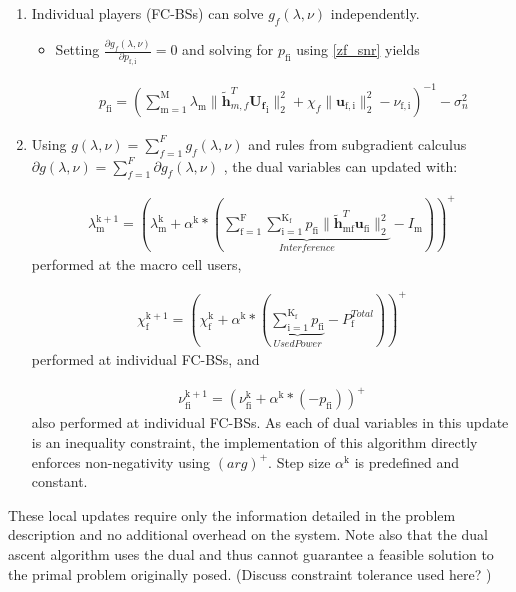 \documentclass[12pt,a4paper]{report}
\begin{document}
\begin{enumerate}
\item 
Individual players (FC-BSs) can solve $ g_f(\lambda,\nu) $ independently.
\begin{itemize}
\item Setting $\frac{\partial g_f(\lambda,\nu)}{\partial p_{\mathrm{f,i}}} = 0$ 
and solving for $p_{\mathrm{fi}}$ using \eqref{zf_snr} yields

\begin{gather}
p_{\mathrm{fi}} = (\sum_{\mathrm{m=1}}^{\mathrm{M}}\lambda_{\mathrm{m}}\|\mathbf{\tilde{h}}_{m,f}^T \mathbf{U_f}_{\mathrm{i}}\|^2_2
+\chi_{f} \|\mathbf{u}_{\mathrm{f,i}}\|^2_2
-\nu_{\mathrm{f,i}}
 )^{-1}
  - \sigma^2_n
\end{gather}

\end{itemize}
\item 
Using $g(\lambda,\nu) = \sum_{f=1}^{F}g_f(\lambda,\nu)$ and rules from subgradient calculus 
$\partial g(\lambda,\nu) = \sum_{f=1}^{F} \partial g_f(\lambda,\nu)$ 
, the dual variables can updated with:

\begin{gather}
\lambda_{\mathrm{m}}^{\mathrm{k+1}} = (
\lambda_{\mathrm{m}}^{\mathrm{k}}
+
\alpha^{\mathrm{k}}*
(
\underbrace{
\sum _{\mathrm{f=1}}^{\mathrm{F}}
\sum _{\mathrm{i=1}}^{\mathrm{K_{\mathrm{f}}}}
p_{\mathrm{fi}}
\|\mathbf{\tilde{h}}_{\mathrm{mf}}^T \mathbf{u_{\mathrm{fi}}}\|^2_2}_{Interference}
- I_{\mathrm{m}}
))^+
\end{gather}
performed at the macro cell users,

\begin{gather}
\chi_{\mathrm{f}}^{\mathrm{k+1}} = (
\chi_{\mathrm{f}}^{\mathrm{k}}
+
\alpha^{\mathrm{k}}*
(\underbrace{\sum_{\mathrm{i=1}}^{\mathrm{K_{\mathrm{f}}}} p_{\mathrm{fi}}}_{Used Power} - P_{\mathrm{f}}^{Total}) )^+
\end{gather}
performed at individual FC-BSs, and 

\begin{gather}
\nu_{\mathrm{fi}}^{\mathrm{k+1}} = (
\nu_{\mathrm{fi}}^{\mathrm{k}}
+
\alpha^{\mathrm{k}}*
(-p_{\mathrm{fi}}))^+
\end{gather}
also performed at individual FC-BSs.
As each of dual variables in this update is an inequality constraint, the implementation of this algorithm directly enforces non-negativity using 
$(arg)^+$.
Step size $\alpha^{\mathrm{k}}$ is predefined and constant.



\end{enumerate} 
These local updates require only the information detailed in the problem description and no additional overhead on the system. 
Note also that the dual ascent algorithm uses the dual and thus cannot guarantee a feasible solution to the primal problem originally posed. (Discuss constraint tolerance used here? )
\end{document}
